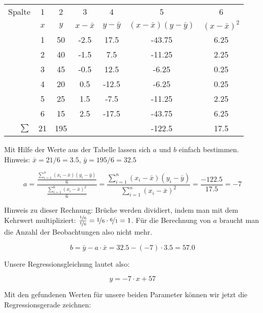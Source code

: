 \documentclass[ngerman, 12pt]{scrartcl}
\begin{document}
\begin{center}
\begin{tabular}{r|cccccc} \toprule
Spalte & 1 & 2 & 3 & 4 & 5 & 6 \\
& $x$	&	$y$	&	$x-\bar{x}$	&	$y-\bar{y}$	&	$(x-\bar{x})(y-\bar{y})$	&	$(x-\bar{x})^2$	\\ \midrule
& 1 &  50 &      -2.5 &      17.5 &                -43.75 &          6.25 \\
& 2 &  40 &      -1.5 &       7.5 &                -11.25 &          2.25 \\
& 3 &  45 &      -0.5 &      12.5 &                 -6.25 &          0.25 \\
& 4 &  20 &       0.5 &     -12.5 &                 -6.25 &          0.25 \\
& 5 &  25 &       1.5 &      -7.5 &                -11.25 &          2.25 \\
& 6 &  15 &       2.5 &     -17.5 &                -43.75 &          6.25 \\
\midrule
$\sum$ & 21 & 195 & & & -122.5 & 17.5 \\ \bottomrule
\end{tabular}
\end{center}

Mit Hilfe der Werte aus der Tabelle lassen sich \(a\) und \(b\) einfach bestimmen. Hinweis: \(\bar x = 21/6 = 3.5\), \(\bar y = 195/6 = 32.5 \)

\[ a = \frac{\frac{\sum_{i=1}^n \left(x_i-\bar x \right)\left(y_i-\bar y \right)}{6}}{ 
\frac{\sum_{i=1}^6 \left( x_i - \bar x \right)^2}{6}} = \frac{\sum_{i=1}^n\left(x_i-\bar x \right)\left(y_i-\bar y \right)}{\sum_{i=1}^n \left(x_i-\bar x \right)^2}  = \frac{-122.5}{17.5} = -7 \]

Hinweis zu dieser Rechnung: Brüche werden dividiert, indem man mit dem Kehrwert multipliziert: \( \frac{\nicefrac{1}{6}}{\nicefrac{1}{6}}   = \nicefrac{1}{6} \cdot \nicefrac{6}{1}  = 1 \). Für die Berechnung von \(a\) braucht man die Anzahl der Beobachtungen also nicht mehr.

\[ b = \bar y - a\cdot \bar x = 32.5
 - (-7) \cdot 3.5 = 57.0
 \]

Unsere Regressionsgleichung lautet also:

\[
y = -7 \cdot x + 57
\]


Mit den gefundenen Werten für unsere beiden Parameter können wir jetzt die Regressionsgerade zeichnen:\vspace*{-11mm}
\end{document}

